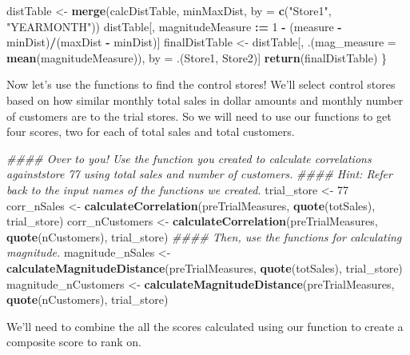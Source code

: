 \documentclass[]{article}
\newenvironment{Shaded}{\begin{snugshade}}{\end{snugshade}}
\newcommand{\CommentTok}[1]{\textcolor[rgb]{0.56,0.35,0.01}{\textit{#1}}}
\newcommand{\DataTypeTok}[1]{\textcolor[rgb]{0.13,0.29,0.53}{#1}}
\newcommand{\DecValTok}[1]{\textcolor[rgb]{0.00,0.00,0.81}{#1}}
\newcommand{\ErrorTok}[1]{\textcolor[rgb]{0.64,0.00,0.00}{\textbf{#1}}}
\newcommand{\KeywordTok}[1]{\textcolor[rgb]{0.13,0.29,0.53}{\textbf{#1}}}
\newcommand{\NormalTok}[1]{#1}
\newcommand{\OperatorTok}[1]{\textcolor[rgb]{0.81,0.36,0.00}{\textbf{#1}}}
\newcommand{\StringTok}[1]{\textcolor[rgb]{0.31,0.60,0.02}{#1}}
\begin{document}
\begin{Shaded}
\begin{Highlighting}[]
\NormalTok{  distTable <-}\StringTok{ }\KeywordTok{merge}\NormalTok{(calcDistTable, minMaxDist, }\DataTypeTok{by =} \KeywordTok{c}\NormalTok{(}\StringTok{"Store1"}\NormalTok{, }\StringTok{"YEARMONTH"}\NormalTok{))}
\NormalTok{  distTable[, magnitudeMeasure }\OperatorTok{:}\ErrorTok{=}\StringTok{ }\DecValTok{1} \OperatorTok{-}\StringTok{ }\NormalTok{(measure }\OperatorTok{-}\StringTok{ }\NormalTok{minDist)}\OperatorTok{/}\NormalTok{(maxDist }\OperatorTok{-}\StringTok{ }\NormalTok{minDist)]}
\NormalTok{  finalDistTable <-}\StringTok{ }\NormalTok{distTable[, .(}\DataTypeTok{mag_measure =} \KeywordTok{mean}\NormalTok{(magnitudeMeasure)), }
\NormalTok{                              by =}\StringTok{ }\NormalTok{.(Store1, Store2)]}
  \KeywordTok{return}\NormalTok{(finalDistTable)}
\NormalTok{\}}
\end{Highlighting}
\end{Shaded}

Now let's use the functions to find the control stores! We'll select
control stores based on how similar monthly total sales in dollar
amounts and monthly number of customers are to the trial stores. So we
will need to use our functions to get four scores, two for each of total
sales and total customers.

\begin{Shaded}
\begin{Highlighting}[]
\CommentTok{#### Over to you! Use the function you created to calculate correlations againststore 77 using total sales and number of customers.}
\CommentTok{#### Hint: Refer back to the input names of the functions we created.}
\NormalTok{trial_store <-}\StringTok{ }\DecValTok{77}
\NormalTok{corr_nSales <-}\StringTok{ }\KeywordTok{calculateCorrelation}\NormalTok{(preTrialMeasures, }\KeywordTok{quote}\NormalTok{(totSales), trial_store)}
\NormalTok{corr_nCustomers <-}\StringTok{ }\KeywordTok{calculateCorrelation}\NormalTok{(preTrialMeasures, }\KeywordTok{quote}\NormalTok{(nCustomers), trial_store)}
\CommentTok{#### Then, use the functions for calculating magnitude.}
\NormalTok{magnitude_nSales <-}\StringTok{ }\KeywordTok{calculateMagnitudeDistance}\NormalTok{(preTrialMeasures, }\KeywordTok{quote}\NormalTok{(totSales), trial_store)}
\NormalTok{magnitude_nCustomers <-}\StringTok{ }\KeywordTok{calculateMagnitudeDistance}\NormalTok{(preTrialMeasures, }\KeywordTok{quote}\NormalTok{(nCustomers), trial_store)}
\end{Highlighting}
\end{Shaded}

We'll need to combine the all the scores calculated using our function
to create a composite score to rank on.
\end{document}
